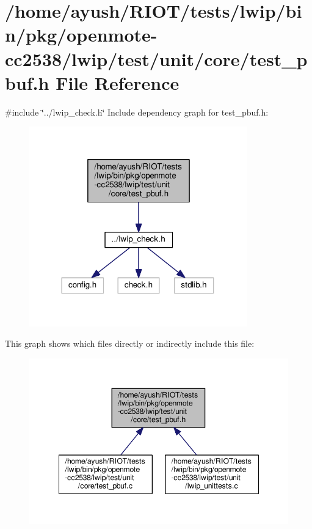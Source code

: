 \hypertarget{openmote-cc2538_2lwip_2test_2unit_2core_2test__pbuf_8h}{}\section{/home/ayush/\+R\+I\+O\+T/tests/lwip/bin/pkg/openmote-\/cc2538/lwip/test/unit/core/test\+\_\+pbuf.h File Reference}
\label{openmote-cc2538_2lwip_2test_2unit_2core_2test__pbuf_8h}
{\ttfamily \#include \char`\"{}../lwip\+\_\+check.\+h\char`\"{}}\newline
Include dependency graph for test\+\_\+pbuf.\+h\+:
\nopagebreak
\begin{figure}[H]
\begin{center}
\leavevmode
\includegraphics[width=267pt]{openmote-cc2538_2lwip_2test_2unit_2core_2test__pbuf_8h__incl}
\end{center}
\end{figure}
This graph shows which files directly or indirectly include this file\+:
\nopagebreak
\begin{figure}[H]
\begin{center}
\leavevmode
\includegraphics[width=348pt]{openmote-cc2538_2lwip_2test_2unit_2core_2test__pbuf_8h__dep__incl}
\end{center}
\end{figure}
